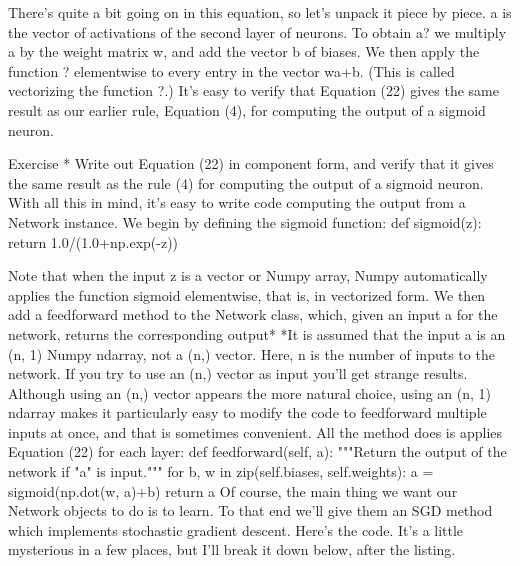 There's quite a bit going on in this equation, so let's unpack it piece by piece. a is the vector of activations of the second layer of neurons. To obtain a? we multiply a by the weight matrix w, and add the vector b of biases. We then apply the function ? elementwise to every entry in the vector wa+b. (This is called vectorizing the function ?.) It's easy to verify that Equation (22) gives the same result as our earlier rule, Equation (4), for computing the output of a sigmoid neuron.

Exercise
* Write out Equation (22) in component form, and verify that it gives the same result as the rule (4) for computing the output of a sigmoid neuron. 
With all this in mind, it's easy to write code computing the output from a Network instance. We begin by defining the sigmoid function: 
def sigmoid(z):
    return 1.0/(1.0+np.exp(-z))

Note that when the input z is a vector or Numpy array, Numpy automatically applies the function sigmoid elementwise, that is, in vectorized form.
We then add a feedforward method to the Network class, which, given an input a for the network, returns the corresponding output* 
*It is assumed that the input a is an (n, 1) Numpy ndarray, not a (n,) vector. Here, n is the number of inputs to the network. If you try to use an (n,) vector as input you'll get strange results. Although using an (n,) vector appears the more natural choice, using an (n, 1) ndarray makes it particularly easy to modify the code to feedforward multiple inputs at once, and that is sometimes convenient. 
All the method does is applies Equation (22) for each layer: 
    def feedforward(self, a):
        """Return the output of the network if "a" is input."""
        for b, w in zip(self.biases, self.weights):
            a = sigmoid(np.dot(w, a)+b)
        return a
Of course, the main thing we want our Network objects to do is to learn. To that end we'll give them an SGD method which implements stochastic gradient descent. Here's the code. It's a little mysterious in a few places, but I'll break it down below, after the listing.

